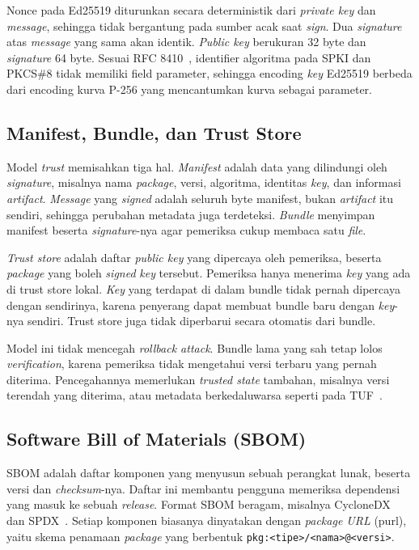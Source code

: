 Nonce pada Ed25519 diturunkan secara deterministik dari \textit{private key} dan \textit{message}, sehingga tidak
bergantung pada sumber acak saat \textit{sign}. Dua \textit{signature} atas \textit{message} yang sama akan
identik. \textit{Public key} berukuran 32 byte dan \textit{signature} 64 byte. Sesuai RFC 8410~\cite{rfc8410}, identifier
algoritma pada SPKI dan PKCS\#8 tidak memiliki field parameter, sehingga encoding \textit{key} Ed25519
berbeda dari encoding kurva P-256 yang mencantumkan kurva sebagai parameter.

\subsection{Manifest, Bundle, dan Trust Store}
Model \textit{trust} memisahkan tiga hal. \textit{Manifest} adalah data yang dilindungi oleh \textit{signature}, misalnya nama \textit{package}, versi, algoritma, identitas \textit{key}, dan informasi \textit{artifact}. \textit{Message}
yang \textit{signed} adalah seluruh byte manifest, bukan \textit{artifact} itu sendiri, sehingga perubahan
metadata juga terdeteksi. \textit{Bundle} menyimpan manifest beserta \textit{signature}-nya agar
pemeriksa cukup membaca satu \textit{file}.

\textit{Trust store} adalah daftar \textit{public key} yang dipercaya oleh pemeriksa, beserta \textit{package}
yang boleh \textit{signed} \textit{key} tersebut. Pemeriksa hanya menerima \textit{key} yang ada di trust
store lokal. \textit{Key} yang terdapat di dalam bundle tidak pernah dipercaya dengan sendirinya,
karena penyerang dapat membuat bundle baru dengan \textit{key}-nya sendiri. Trust store juga tidak
diperbarui secara otomatis dari bundle.

Model ini tidak mencegah \textit{rollback attack}. Bundle lama yang sah tetap lolos \textit{verification},
karena pemeriksa tidak mengetahui versi terbaru yang pernah diterima. Pencegahannya memerlukan
\textit{trusted state} tambahan, misalnya versi terendah yang diterima, atau metadata
berkedaluwarsa seperti pada TUF~\cite{tuf}.

\subsection{Software Bill of Materials (SBOM)}
SBOM adalah daftar komponen yang menyusun sebuah perangkat lunak, beserta versi dan
\textit{checksum}-nya. Daftar ini membantu pengguna memeriksa dependensi yang masuk ke sebuah
\textit{release}. Format SBOM beragam, misalnya CycloneDX~\cite{cyclonedx} dan SPDX~\cite{spdx}. Setiap komponen biasanya dinyatakan
dengan \textit{package URL} (purl), yaitu skema penamaan \textit{package} yang berbentuk
\texttt{pkg:<tipe>/<nama>@<versi>}.

